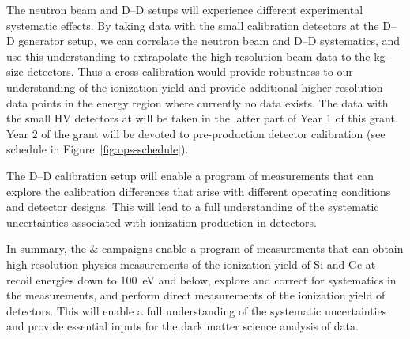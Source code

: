 The neutron beam and D--D setups will experience different experimental systematic effects.  By taking data with the small calibration detectors at the D--D generator setup, we can correlate the neutron beam and D--D systematics, and use this understanding to extrapolate the high-resolution beam data to the kg-size detectors.  Thus a cross-calibration would provide robustness to our understanding of the ionization yield and provide additional higher-resolution data points in the energy region where currently no data exists. The data with the small HV detectors at \nexus will be taken in the latter part of Year 1 of this grant. Year 2 of the grant will be devoted to pre-production \scs detector calibration (see schedule in Figure~\ref{fig:ops-schedule}).

The D--D calibration setup will enable a program of measurements that can explore the calibration differences that arise with different operating conditions and detector designs.  This will lead to a full understanding of the systematic uncertainties associated with ionization production in \SuperCDMS detectors. 

In summary, the \tunl \& \nexus campaigns enable a program of measurements that can obtain high-resolution physics measurements of the ionization yield of Si and Ge at recoil energies down to 100~eV and below, explore and correct for systematics in the measurements, and perform direct measurements of the ionization yield of \scs detectors.  This will enable a full understanding of the systematic uncertainties and provide essential inputs for the dark matter science analysis of \scs data.